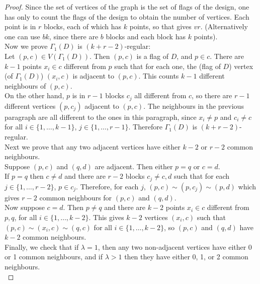 \documentclass[letterpaper,10pt]{article}
\theoremstyle{plain}
\theoremstyle{definition}
\begin{document}
 \begin{proof}
     Since the set of vertices of the graph is the set of flags of the design, one has only to count the flags of the design to obtain the number of vertices. Each point is in $r$ blocks, each of which has $k$ points, so that gives $vr$. (Alternatively one can use $bk$, since there are $b$ blocks and each block has $k$ points).\\

     Now we prove $\Gamma_1(D)$ is $(k+r-2)$-regular:\\
     
     Let $(p,c)\in V(\Gamma_1(D))$. Then $(p,c)$ is a flag of $D$, and $p\in c$. There are $k-1$ points $x_i\in c$ different from $p$ such that for each one, the (flag of $D$) vertex (of $\Gamma_1(D)$) $(x_i,c)$ is adjacent to $(p,c)$. This counts $k-1$ different neighbours of $(p,c)$.\\

     On the other hand, $p$ is in $r-1$ blocks $c_j$ all different from $c$, so there are $r-1$ different vertices $(p,c_j)$ adjacent to $(p,c)$. The neighbours in the previous paragraph are all different to the ones in this paragraph, since $x_i\neq p$ and $c_i\neq c$ for all $i\in\{1,\ldots,k-1\}$, $j\in\{1,\ldots,r-1\}$. Therefore $\Gamma_1(D)$ is $(k+r-2)$-regular.\\

     Next we prove that any two adjacent vertices have either $k-2$ or $r-2$ common neighbours.\\

     Suppose $(p,c)$ and $(q,d)$ are adjacent. Then either $p=q$ or $c=d$.\\
     If $p=q$ then $c\neq d$ and there are $r-2$ blocks $c_j\neq c,d$ such that for each $j\in\{1,\ldots,r-2\}$, $p\in c_j$. Therefore, for each $j$, $(p,c)\sim(p,c_j)\sim(p,d)$ which gives $r-2$ common neighbours for $(p,c)$ and $(q,d)$.\\
     Now suppose $c=d$. Then $p\neq q$ and there are $k-2$ points $x_i\in c$ different from $p,q$, for all $i\in\{1,\ldots,k-2\}$. This gives $k-2$ vertices $(x_i,c)$ such that $(p,c)\sim(x_i,c)\sim(q,c)$ for all $i\in\{1,\ldots,k-2\}$, so $(p,c)$ and $(q,d)$ have $k-2$ common neighbours.\\

     Finally, we check that if $\lambda=1$, then any two non-adjacent vertices have either 0 or 1 common neighbours, and if $\lambda>1$ then they have either 0, 1, or 2 common neighbours.\\


\end{proof}
\end{document}
